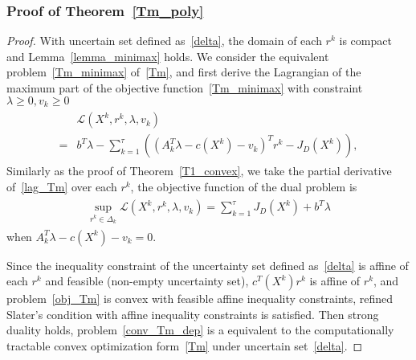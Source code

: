 \documentclass[10pt,twocolumn,twoside,english]{IEEEtran}
\begin{document}
\subsubsection{Proof of Theorem~\ref{Tm_poly}}
\label{appendix_Tm_poly2}
\begin{proof}
With uncertain set defined as~\eqref{delta}, the domain of each $r^k$ is compact and Lemma~\ref{lemma_minimax} holds. We consider the equivalent problem~\eqref{Tm_minimax} of~\eqref{Tm}, and first derive the Lagrangian of the maximum part of the objective function~\eqref{Tm_minimax} with constraint $\lambda \geq 0, v_{k} \geq 0$\begin{align}
\begin{split}
    &\mathcal{L}(X^k,r^k, \lambda,v_{k})\\
=&b^T\lambda-\sum_{k=1}^{\tau}((A^T_k\lambda-c(X^k)-v_k)^T r^k-J_D(X^k)),\end{split}
\label{lag_Tm}
\end{align}
Similarly as the proof of Theorem~\ref{T1_convex}, we take the partial derivative of~\eqref{lag_Tm} over each $r^{k}$, the objective function of the dual problem is 
\begin{align*}\begin{split} 
\sup_{r^k \in \Delta_k} \mathcal{L}(X^k,r^k,\lambda,v_{k})=\sum\limits_{k=1}^{\tau} J_D(X^k)+b^T\lambda 
\end{split}
\end{align*}
when $A_{k}^T\lambda-c(X^{k})-v_{k}=0$.




Since the inequality constraint of the uncertainty set defined as~\eqref{delta} is affine of each $r^k$ and feasible (non-empty uncertainty set), $c^T(X^k)r^k$ is affine of $r^k$, and problem~\eqref{obj_Tm} is convex with feasible affine inequality constraints, refined Slater's condition with affine inequality constraints is satisfied. Then strong duality holds, problem~\eqref{conv_Tm_dep} is a equivalent to the computationally tractable convex optimization form~\eqref{Tm} under uncertain set~\eqref{delta}.
\end{proof}
\end{document}
